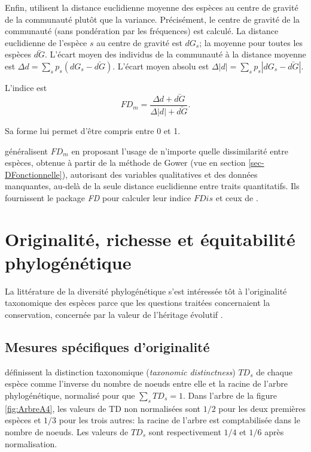 \documentclass[
  11pt,
  french,
  a4paper,
  extrafontsizes,onecolumn,openright
  ]{memoir}
\begin{document}
Enfin, \textcite{Villeger2008a} utilisent la distance euclidienne moyenne des espèces au centre de gravité de la communauté plutôt que la variance.
Précisément, le centre de gravité de la communauté (sans pondération par les fréquences) est calculé.
La distance euclidienne de l'espèce \(s\) au centre de gravité est \(dG_s\); la moyenne pour toutes les espèces \(\bar{dG}\).
L'écart moyen des individus de la communauté à la distance moyenne est \(\Delta d=\sum_s{p_s(dG_s - \bar{dG})}\).
L'écart moyen absolu est \(\Delta |d|=\sum_s{p_s|dG_s - \bar{dG}|}\).

L'indice est
\begin{equation}
  \label{eq:FDm}
  \mathit{FD}_{m} = \frac{\Delta d + \bar{dG}}{\Delta |d| +\bar{dG}}.
\end{equation}

Sa forme lui permet d'être compris entre 0 et 1.

\textcite{Laliberte2010} généralisent \(\mathit{FD}_{m}\) en proposant l'usage de n'importe quelle dissimilarité entre espèces, obtenue à partir de la méthode de Gower (vue en section \ref{sec-DFonctionnelle}), autorisant des variables qualitatives et des données manquantes, au-delà de la seule distance euclidienne entre traits quantitatifs.
Ils fournissent le package \emph{FD} pour calculer leur indice \(\mathit{FDis}\) et ceux de
\textcite{Villeger2008a}.

\section{Originalité, richesse et équitabilité phylogénétique}\label{originalituxe9-richesse-et-uxe9quitabilituxe9-phyloguxe9nuxe9tique}

La littérature de la diversité phylogénétique s'est intéressée tôt à l'originalité taxonomique des espèces parce que les questions traitées concernaient la conservation, concernée par la valeur de l'héritage évolutif \autocite{Faith2008}.

\subsection{Mesures spécifiques d'originalité}\label{mesures-spuxe9cifiques-doriginalituxe9}

\textcite{Vane-Wright1991} définissent la distinction taxonomique (\emph{taxonomic distinctness}) \(\mathit{TD}_s\) de chaque espèce comme l'inverse du nombre de noeuds entre elle et la racine de l'arbre phylogénétique, normalisé pour que \(\sum_s{\mathit{TD}_s} = 1\).
Dans l'arbre de la figure \ref{fig:ArbreA4}, les valeurs de TD non normalisées sont \({1}/{2}\) pour les deux premières espèces et \({1}/{3}\) pour les trois autres: la racine de l'arbre est comptabilisée dans le nombre de noeuds.
Les valeurs de \(\mathit{TD}_s\) sont respectivement \({1}/{4}\) et \({1}/{6}\) après normalisation.
\end{document}
